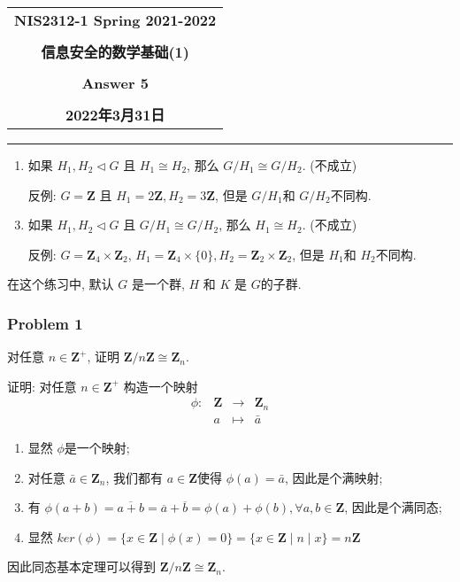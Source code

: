 \documentclass[a4paper,12pt]{ctexart}
\newcommand{\Z}{\mathbf{Z}}
\begin{document}
  \begin{center}

  \vspace{-0.3in}
  \begin{tabular}{c}
    \textbf{\Large NIS2312-1 Spring 2021-2022} \\
    \textbf{\Large  } \\
    \textbf{\Large  信息安全的数学基础(1)} \\
    \textbf{\Large  } \\
    \textbf{\Large  Answer 5} \\
    \textbf{\Large  } \\
    \textbf{\Large 2022年3月31日} \\
  \end{tabular}
  \end{center}
  \noindent
  \rule{\linewidth}{0.4pt}

  \begin{enumerate}
    \item 如果 $ H_1,H_2\triangleleft G $ 且 $ H_1\cong H_2 $, 那么 $ G/H_1\cong G/H_2 $. (不成立)
    \item[反例:] $ G=\Z $ 且 $ H_1=2\Z,H_2=3\Z $, 但是 $ G/H_1 $和 $ G/H_2 $不同构.
    \item 如果 $ H_1,H_2\triangleleft G $ 且 $ G/H_1\cong G/H_2 $, 那么 $ H_1\cong H_2 $. (不成立)
    \item[反例:] $ G=\Z_4\times\Z_2 $, $ H_1=\Z_4\times\{0\},H_2=\Z_2\times\Z_2 $, 但是 $ H_1 $和 $ H_2 $不同构.
  \end{enumerate}


  在这个练习中, 默认 $G$ 是一个群, $H$ 和 $K$ 是 $ G $的子群.
\subsubsection*{Problem 1}
    对任意 $ n\in\Z^+ $, 证明 $ \Z/n\Z\cong\Z_n $.

    证明: 对任意 $ n\in\Z^+ $ 构造一个映射
    \[ \begin{array}{cccc}
      \phi:& \Z&\rightarrow&\Z_n\\
      &a&\mapsto&\bar{a}
    \end{array} \]
    \begin{enumerate}
      \item 显然 $ \phi $是一个映射;
      \item 对任意 $ \bar{a}\in\Z_n $, 我们都有 $ a\in\Z $使得 $ \phi(a)=\bar{a} $, 因此是个满映射;
      \item 有 $ \phi(a+b)=\overline{a+b}=\overline{a}+\overline{b}=\phi(a)+\phi(b),\forall a,b\in\Z $, 因此是个满同态;
      \item 显然 $ ker(\phi)=\{x\in\Z\mid \phi(x)=0\}=\{x\in\Z\mid n\mid x\}=n\Z $
    \end{enumerate}
    因此同态基本定理可以得到 $ \Z/n\Z\cong \Z_n $.
\end{document}
